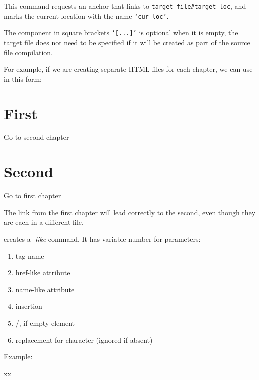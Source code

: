 This command requests an anchor that links to \verb|target-file#target-loc|, and marks the current location with the name \verb|‘cur-loc’|.

The component in square brackets \texttt{‘[...]’} is optional when it is empty, 
the target file does not need to be specified if it will be created as part of
the source file compilation. 

For example, if we are creating separate HTML
files for each chapter, we can use \texcommand{\Link} in this form:

\begin{texsource}
\chapter{First}
Go to second chapter\EndLink
\chapter{Second}
Go to first chapter\EndLink
\end{texsource}

The link from the first chapter will lead correctly to the second, even though they are each in a different file.



 creates a \textit{-like} command. It has variable number for parameters:

\begin{enumerate}
  \item tag name
  \item href-like attribute
  \item name-like attribute
  \item insertion
  \item /, if empty element
  \item replacement for \texcommand{#} character  (ignored if absent)
\end{enumerate}

Example:

\begin{texsource}
\LinkCommand{}
\def\jsref="#1"{href="javascript:window.open('#1')"}

xx\EndJSLink %
\EndLink       %
\end{texsource}


